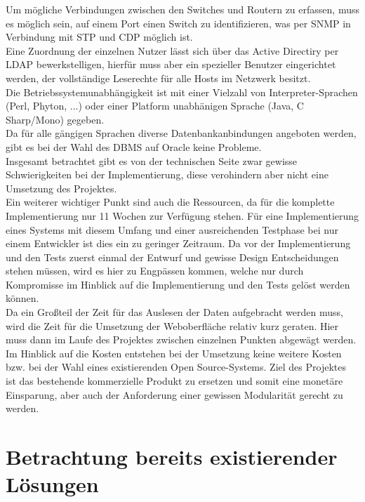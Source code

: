 Um mögliche Verbindungen zwischen den Switches und Routern zu erfassen, muss es möglich sein, auf einem Port einen Switch zu identifizieren, was per SNMP in Verbindung mit STP und CDP möglich ist.\\
Eine Zuordnung der einzelnen Nutzer lässt sich über das Active Directiry per LDAP bewerkstelligen, hierfür muss aber ein spezieller Benutzer eingerichtet werden, der vollständige Leserechte für alle Hosts im Netzwerk besitzt.\\
Die Betriebssystemunabhängigkeit ist mit einer Vielzahl von Interpreter-Sprachen (Perl, Phyton, ...) oder einer Platform unabhänigen Sprache (Java, C Sharp/Mono) gegeben.\\
Da für alle gängigen Sprachen diverse Datenbankanbindungen angeboten werden, gibt es bei der Wahl des DBMS auf Oracle keine Probleme.\\
Insgesamt betrachtet gibt es von der technischen Seite zwar gewisse Schwierigkeiten bei der Implementierung, diese verohindern aber nicht eine Umsetzung des Projektes.\\

Ein weiterer wichtiger Punkt sind auch die Ressourcen, da für die komplette Implementierung nur 11 Wochen zur Verfügung stehen. Für eine Implementierung eines Systems mit diesem Umfang und einer ausreichenden Testphase bei nur einem Entwickler ist dies ein zu geringer Zeitraum. Da vor der Implementierung und den Tests zuerst einmal der Entwurf und gewisse Design Entscheidungen stehen müssen, wird es hier zu Engpässen kommen, welche nur durch Kompromisse im Hinblick auf die Implementierung und den Tests gelöst werden können.\\
Da ein Großteil der Zeit für das Auslesen der Daten aufgebracht werden muss, wird die Zeit für die Umsetzung der Weboberfläche relativ kurz geraten. Hier muss dann im Laufe des Projektes zwischen einzelnen Punkten abgewägt werden.\\

Im Hinblick auf die Kosten entstehen bei der Umsetzung keine weitere Kosten bzw. bei der Wahl eines existierenden Open Source-Systems. Ziel des Projektes ist das bestehende kommerzielle Produkt zu ersetzen und somit eine monetäre Einsparung, aber auch der Anforderung einer gewissen Modularität gerecht zu werden.\\

\section{Betrachtung bereits existierender Lösungen}
\label{sec:exitloesungen}

